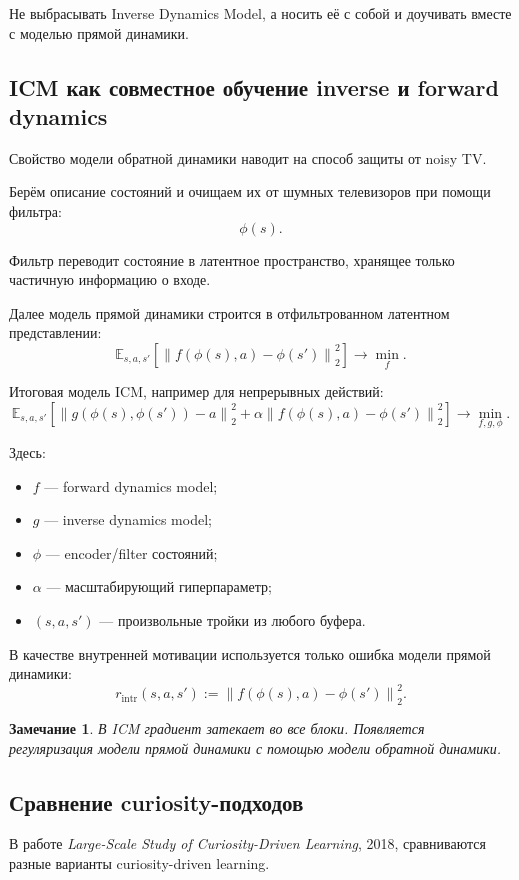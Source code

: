 \documentclass[12pt,a4paper]{article}
\newtheorem{remark}{Замечание}
\begin{document}
Не выбрасывать Inverse Dynamics Model, а носить её с собой и доучивать вместе с моделью прямой динамики.

\subsection{ICM как совместное обучение inverse и forward dynamics}

Свойство модели обратной динамики наводит на способ защиты от noisy TV.

Берём описание состояний и очищаем их от шумных телевизоров при помощи фильтра:
\[
\phi(s).
\]

Фильтр переводит состояние в латентное пространство, хранящее только частичную информацию о входе.

Далее модель прямой динамики строится в отфильтрованном латентном представлении:
\[
\mathbb E_{s,a,s'}
\left[
\left\|
f(\phi(s),a)-\phi(s')
\right\|_2^2
\right]
\to
\min_f.
\]

Итоговая модель ICM, например для непрерывных действий:
\[
\mathbb E_{s,a,s'}
\left[
\left\|
g(\phi(s),\phi(s'))-a
\right\|_2^2
+
\alpha
\left\|
f(\phi(s),a)-\phi(s')
\right\|_2^2
\right]
\to
\min_{f,g,\phi}.
\]

Здесь:
\begin{itemize}
    \item $f$ --- forward dynamics model;
    \item $g$ --- inverse dynamics model;
    \item $\phi$ --- encoder/filter состояний;
    \item $\alpha$ --- масштабирующий гиперпараметр;
    \item $(s,a,s')$ --- произвольные тройки из любого буфера.
\end{itemize}

В качестве внутренней мотивации используется только ошибка модели прямой динамики:
\[
r_{\mathrm{intr}}(s,a,s')
:=
\left\|
f(\phi(s),a)-\phi(s')
\right\|_2^2.
\]

\begin{remark}
В ICM градиент затекает во все блоки. Появляется регуляризация модели прямой динамики с помощью модели обратной динамики.
\end{remark}

\subsection{Сравнение curiosity-подходов}

В работе \textit{Large-Scale Study of Curiosity-Driven Learning}, 2018, сравниваются разные варианты curiosity-driven learning.
\end{document}
